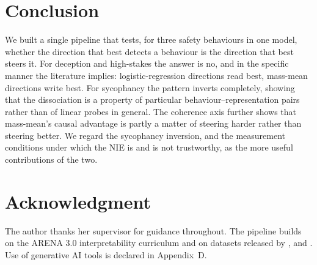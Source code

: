\documentclass[conference]{IEEEtran}
\begin{document}
\section{Conclusion}

We built a single pipeline that tests, for three safety behaviours in one model,
whether the direction that best detects a behaviour is the direction that best
steers it. For deception and high-stakes the answer is no, and in the specific
manner the literature implies: logistic-regression directions read best,
mass-mean directions write best. For sycophancy the pattern inverts completely,
showing that the dissociation is a property of particular
behaviour--representation pairs rather than of linear probes in general. The
coherence axis further shows that mass-mean's causal advantage is partly a
matter of steering harder rather than steering better. We regard the sycophancy
inversion, and the measurement conditions under which the NIE is and is not
trustworthy, as the more useful contributions of the two.

\section*{Acknowledgment}

The author thanks her supervisor for guidance throughout. The pipeline builds on
the ARENA 3.0 interpretability curriculum \citep{arena2024} and on datasets
released by \citet{goldowsky2025}, \citet{mckenzie2025} and
\citet{cincynlp2025}. Use of generative AI tools is declared in Appendix~D.
\end{document}
